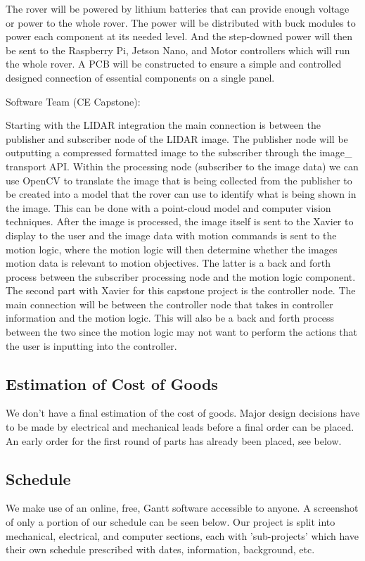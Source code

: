 \documentclass[a4paper, 10pt]{article}
\begin{document}
The rover will be powered by lithium batteries that can provide enough voltage or power to the whole rover. The power will be distributed with buck modules to power each component at its needed level. And the step-downed power will then be sent to the Raspberry Pi, Jetson Nano, and Motor controllers which will run the whole rover. A PCB will be constructed to ensure a simple and controlled designed connection of essential components on a single panel.

	Software Team (CE Capstone):
	
Starting with the LIDAR integration the main connection is between the publisher and subscriber node of the LIDAR image. The publisher node will be outputting a compressed formatted image to the subscriber through the image\_ transport API. Within the processing node (subscriber to the image data) we can use OpenCV to translate the image that is being collected from the publisher to be created into a model that the rover can use to identify what is being shown in the image. This can be done with a point-cloud model and computer vision techniques. After the image is processed, the image itself is sent to the Xavier to display to the user and the image data with motion commands is sent to the motion logic, where the motion logic will then determine whether the images motion data is relevant to motion objectives. The latter is a back and forth process between the subscriber processing node and the motion logic component. 
The second part with Xavier for this capstone project is the controller node. The main connection will be between the controller node that takes in controller information and the motion logic. This will also be a back and forth process between the two since the motion logic may not want to perform the actions that the user is inputting into the controller. 



	\subsection{Estimation of Cost of Goods}
	We don't have a final estimation of the cost of goods. Major design decisions have to be made by electrical and mechanical leads before a final order can be placed. An early order for the first round of parts has already been placed, see below. 


	\subsection{Schedule}
	We make use of an online, free, Gantt software accessible to anyone. A screenshot of only a portion of our schedule can be seen below. Our project is split into mechanical, electrical, and computer sections, each with 'sub-projects' which have their own schedule prescribed with dates, information, background, etc.
\end{document}
